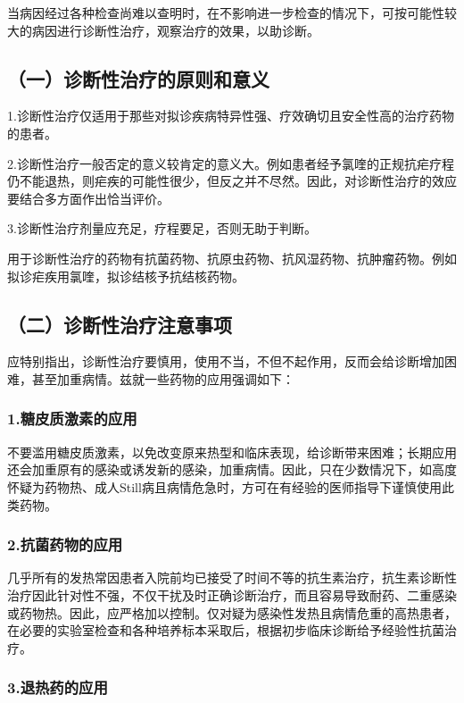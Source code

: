 当病因经过各种检查尚难以查明时，在不影响进一步检查的情况下，可按可能性较大的病因进行诊断性治疗，观察治疗的效果，以助诊断。

\subsection{（一）诊断性治疗的原则和意义}

1.诊断性治疗仅适用于那些对拟诊疾病特异性强、疗效确切且安全性高的治疗药物的患者。

2.诊断性治疗一般否定的意义较肯定的意义大。例如患者经予氯喹的正规抗疟疗程仍不能退热，则疟疾的可能性很少，但反之并不尽然。因此，对诊断性治疗的效应要结合多方面作出恰当评价。

3.诊断性治疗剂量应充足，疗程要足，否则无助于判断。

用于诊断性治疗的药物有抗菌药物、抗原虫药物、抗风湿药物、抗肿瘤药物。例如拟诊疟疾用氯喹，拟诊结核予抗结核药物。

\subsection{（二）诊断性治疗注意事项}

应特别指出，诊断性治疗要慎用，使用不当，不但不起作用，反而会给诊断增加困难，甚至加重病情。兹就一些药物的应用强调如下：

\subsubsection{1.糖皮质激素的应用}

不要滥用糖皮质激素，以免改变原来热型和临床表现，给诊断带来困难；长期应用还会加重原有的感染或诱发新的感染，加重病情。因此，只在少数情况下，如高度怀疑为药物热、成人Still病且病情危急时，方可在有经验的医师指导下谨慎使用此类药物。

\subsubsection{2.抗菌药物的应用}

几乎所有的发热常因患者入院前均已接受了时间不等的抗生素治疗，抗生素诊断性治疗因此针对性不强，不仅干扰及时正确诊断治疗，而且容易导致耐药、二重感染或药物热。因此，应严格加以控制。仅对疑为感染性发热且病情危重的高热患者，在必要的实验室检查和各种培养标本采取后，根据初步临床诊断给予经验性抗菌治疗。

\subsubsection{3.退热药的应用}

